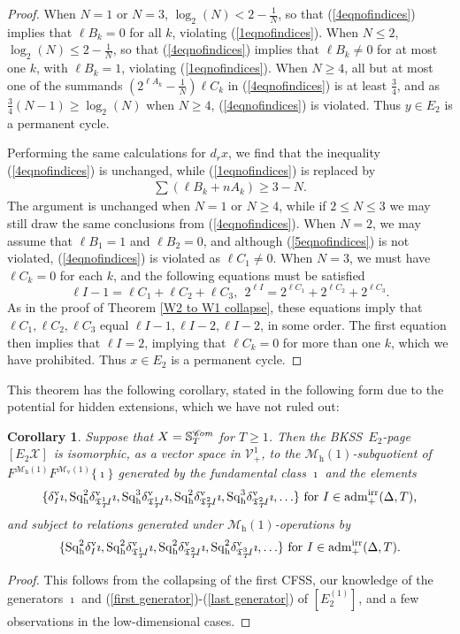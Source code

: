 \documentclass[11pt]{amsart} \renewcommand{\baselinestretch}{1.2}
\theoremstyle{plain}
\newtheorem{cor}[thm]{Corollary}
\numberwithin{equation}{section} %
\theoremstyle{plain}
\newtheorem{cor}[thm]{Corollary}
\numberwithin{equation}{chapter} %
\newcommand{\scrC}{\mathscr{C}}
\newcommand{\calV}{\mathcal{V}}
\newcommand{\calx}{\mathcal{X}}
\newcommand{\calMv}{\mathcal{M}\dver}
\newcommand{\calMh}{\mathcal{M}\dhor}
\newcommand{\vect}[2]{\calV^{#1}_{#2}}
\newcommand{\aDTirr}{\mathrm{adm}_+^\mathrm{irr}(\Delta,T)}
\newcommand{\algs}{{\scrC\!\textit{\normalfont\textit{om}}}}
\newcommand{\TOP}{\mathfrak{T}}
\newcommand{\E}[5]{[E^{#1}_{#2}#3]^{#4}_{#5}}
\newcommand{\uver}{^\mathrm{v}}
\newcommand{\dver}{_\mathrm{v}}
\newcommand{\dhor}{_\mathrm{h}}
\newcommand{\Sqh}{\mathrm{Sq}\dhor}
\newcommand{\deltav}{\delta\uver}
\newcommand{\BKSS}{BKSS}
\newcommand{\CFSS}{CFSS}
\begin{document}
\begin{Calculations of HWn}
\begin{proof}
When $N=1$ or $N=3$, $\log_2(N)<2-\frac{1}{N}$, so that (\ref{4eqnofindices}) implies that $\ell B_k=0$ for all $k$, violating (\ref{1eqnofindices}).
When $N\leq2$, $\log_2(N)\leq 2-\frac{1}{N}$, so that (\ref{4eqnofindices}) implies that $\ell B_k\neq0$ for at most one $k$, with $\ell B_k=1$, violating (\ref{1eqnofindices}).
When $N\geq4$, all but at most one of the summands $(2^{\ell A_k}-\frac{1}{N})\ell C_k$ in (\ref{4eqnofindices}) is at least $\frac{3}{4}$, and as $\frac{3}{4}(N-1)\geq\log_2(N)$ when $N\geq4$, (\ref{4eqnofindices}) is violated. Thus $y\in E_2$ is a permanent cycle.

Performing the same calculations for $d_rx$, we find that the inequality (\ref{4eqnofindices}) is unchanged, while (\ref{1eqnofindices}) is replaced by
\begin{gather}
\textstyle \sum(\ell B_k+nA_k)\geq3-N.\label{5eqnofindices}\end{gather}
The argument is unchanged when $N=1$ or $N\geq4$, while if $2\leq N\leq3$ we may still draw the same conclusions from (\ref{4eqnofindices}). When $N=2$, we may assume that $\ell B_1=1$ and $\ell B_2=0$, and although (\ref{5eqnofindices}) is not violated, (\ref{4eqnofindices}) is violated as $\ell C_1\neq0$. When $N=3$, we must have $\ell C_k=0$ for each $k$, and the following equations must be satisfied
\[\ell I-1=\ell C_1+\ell C_2+\ell C_3,\ \  2^{\ell I}=2^{\ell C_1}+2^{\ell C_2}+2^{\ell C_3}.\]
As in the proof of Theorem \ref{W2 to W1 collapse}, these equations imply that $\ell C_1,\ell C_2,\ell C_3$ equal $\ell I-1,\ell I-2,\ell I-2$, in some order. The first equation then implies that $\ell I=2$, implying that $\ell C_k=0$ for more than one $k$, which we have prohibited. Thus $x\in E_2$ is a permanent cycle.
\end{proof}
This theorem has the following corollary, stated in the following form due to the potential for hidden extensions, which we have not ruled out:
\begin{cor}
\label{the corollary on the bousfield kan e2}
Suppose that $X=\mathbb{S}_{T}^{\algs}$ for $T\geq1$. Then the \BKSS\ $E_2$-page $\E{}{2}{\calx}{}{}$ is isomorphic, as a vector space in $\vect{1}{+}$, to the $\calMh(1)$-subquotient of $F^{\calMh(1)}F^{\calMv(1)}\{\imath\}$ generated by 
the fundamental class $\imath$ and the elements
\[
\{\deltav_{I}\imath,
\Sqh^2\deltav_{\TOP_T^1\!I}\imath,\Sqh^3\deltav_{\TOP_T^1\!I}\imath,
\Sqh^2\deltav_{\TOP_T^2\!I}\imath,\Sqh^3\deltav_{\TOP_T^2\!I}\imath,
\ldots\}\textup{ for $I\in\aDTirr$,}
\]
and subject to  relations generated under $\calMh(1)$-operations by
\[\{
\Sqh^2\deltav_{I}\imath,
\Sqh^2\deltav_{\TOP_T^1\!I}\imath,
\Sqh^2\deltav_{\TOP_T^2\!I}\imath,
\Sqh^2\deltav_{\TOP_T^3\!I}\imath,
\ldots\}\textup{ for $I\in\aDTirr$.}
\]
\end{cor}
\begin{proof}
This follows from the collapsing of the first \CFSS, our knowledge of the generators $\imath$ and (\ref{first generator})-(\ref{last generator}) of $\E{(1)}{2}{}{}{}$, and  a few observations in the low-dimensional cases. 


\end{proof}
\end{Calculations of HWn}
\end{document}
